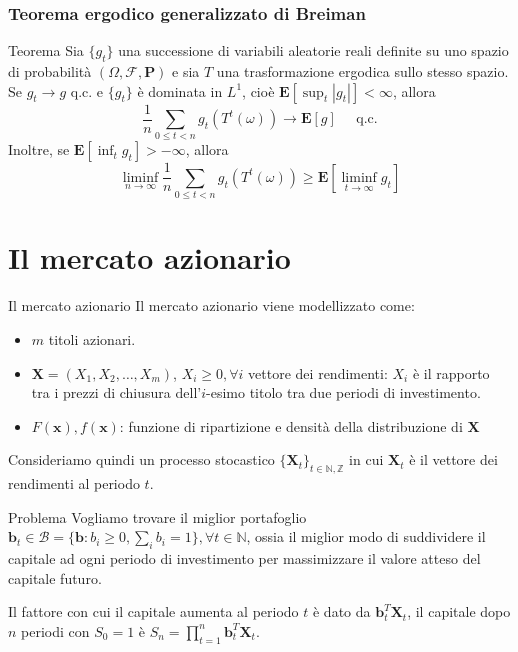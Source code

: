 \documentclass{beamer}
\theoremstyle{plain}
\theoremstyle{definition}
\theoremstyle{remark}
\newcommand{\Z}{\mathbb{Z}}
\newcommand{\N}{\mathbb{N}}
\newcommand{\X}{\bm{X}}
\newcommand{\x}{\bm{x}}
\newcommand{\B}{\bm{b}}
\newcommand{\F}{\mathcal{F}}
\newcommand{\Pro}{\mathbf{P}}
\newcommand{\E}{\mathbf{E}}
\begin{document}
\begin{frame}
	\frametitle{Teorema ergodico generalizzato di Breiman}
	\begin{block}{Teorema}
		Sia $\{g_t\}$ una successione di variabili aleatorie reali definite su uno spazio di probabilità $(\Omega, \F,\Pro)$ e sia $T$ una trasformazione ergodica sullo stesso spazio. Se $g_t\rightarrow g$ q.c. e $\{g_t\}$ è dominata in $L^1$, cioè $\E[\sup_t|g_t|]<\infty$, allora
		\begin{equation}\label{teo:erg1}
		\frac{1}{n}\sum_{0\leq t <n}{g_t(T^t(\omega))}\rightarrow \E[g]\;\;\;\;\; \text{q.c.}
		\end{equation}
		Inoltre, se $\E[\inf_tg_t]>-\infty$, allora
		\begin{equation}\label{teo:erg2}
		\liminf_{n\to\infty}\frac{1}{n}\sum_{0\leq t <n}{g_t(T^t(\omega))}\geq \E[\liminf_{t\to\infty}g_t]
		\end{equation}
	\end{block}
\end{frame}

\section{Il mercato azionario}

\begin{frame}{Il mercato azionario}
	Il mercato azionario viene modellizzato come:
	\begin{itemize}
		\item $m$ titoli azionari.
		\item $\bm{X}=(X_1,X_2, \ldots, X_m)$, $X_i\geq 0, \forall i$ vettore dei rendimenti: $X_i$ è il rapporto tra i prezzi di chiusura dell'$i$-esimo titolo tra due periodi di investimento.
		\item $F(\x), f(\x)$: funzione di ripartizione e densità della distribuzione di $\X$
	\end{itemize}
	Consideriamo quindi un processo stocastico $\{\X_t\}_{t\in \N,\Z}$ in cui $\X_t$ è il vettore dei rendimenti al periodo $t$.
\end{frame}

\begin{frame}
	\begin{block}{Problema}
		Vogliamo trovare il miglior portafoglio $\bm{b}_t\in \mathcal{B}=\{\bm{b}:b_i\geq 0, \sum_i{b_i}=1\},\forall t\in \N$, ossia il miglior modo di suddividere il capitale ad ogni periodo di investimento per massimizzare il valore atteso del capitale futuro.
	\end{block}
	Il fattore con cui il capitale aumenta al periodo $t$ è dato da $\B^T_t\X_t$, il capitale dopo $n$ periodi con $S_0=1$ è $S_n=\prod_{t=1}^{n}{\B_t^T\X_t}$.
\end{frame}
\end{document}
